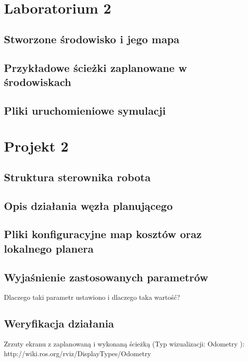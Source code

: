 \documentclass{mwrep}
\begin{document}
\chapter{Laboratorium 2}

\section{Stworzone środowisko i jego mapa}

\section{Przykładowe ścieżki zaplanowane w środowiskach}

\section{Pliki uruchomieniowe symulacji}


\chapter{Projekt 2}

\section{Struktura sterownika robota}

\section{Opis działania węzła planującego}

\section{Pliki konfiguracyjne map kosztów oraz lokalnego planera}

\section{Wyjaśnienie zastosowanych parametrów}
Dlaczego taki parametr ustawiono i dlaczego taka wartość?
\section{Weryfikacja działania}
Zrzuty ekranu z zaplanowaną i wykonaną ścieżką (Typ
wizualizacji: Odometry ): http://wiki.ros.org/rviz/DisplayTypes/Odometry
\end{document}

